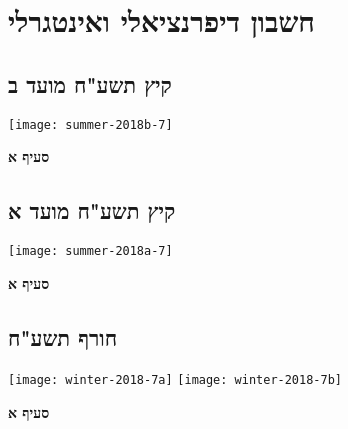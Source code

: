 


\chapter{חשבון דיפרנציאלי ואינטגרלי}


\section{קיץ תשע"ח מועד ב}

\begin{center}
\texttt{[image: summer-2018b-7]}
\end{center}

\vspace{-2ex}

\textbf{סעיף א}


\section{קיץ תשע"ח מועד א}

\begin{center}
\texttt{[image: summer-2018a-7]}
\end{center}

\vspace{-2ex}

\textbf{סעיף א}


\section{חורף תשע"ח}

\begin{center}
\texttt{[image: winter-2018-7a]}
\texttt{[image: winter-2018-7b]}
\end{center}

\vspace{-2ex}

\textbf{סעיף א}

